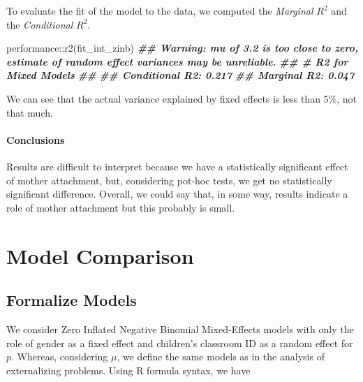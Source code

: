 \documentclass[
]{book}
\newenvironment{Shaded}{\begin{snugshade}}{\end{snugshade}}
\newcommand{\DocumentationTok}[1]{\textcolor[rgb]{0.56,0.35,0.01}{\textbf{\textit{#1}}}}
\newcommand{\FunctionTok}[1]{\textcolor[rgb]{0.00,0.00,0.00}{#1}}
\newcommand{\NormalTok}[1]{#1}
\newcommand{\SpecialCharTok}[1]{\textcolor[rgb]{0.00,0.00,0.00}{#1}}
\begin{document}
To evaluate the fit of the model to the data, we computed the \emph{Marginal} \(R^2\) and the \emph{Conditional} \(R^2\).

\begin{Shaded}
\begin{Highlighting}[]
\NormalTok{performance}\SpecialCharTok{::}\FunctionTok{r2}\NormalTok{(fit\_int\_zinb)}
\DocumentationTok{\#\# Warning: mu of 3.2 is too close to zero, estimate of random effect variances may be unreliable.}
\DocumentationTok{\#\# \# R2 for Mixed Models}
\DocumentationTok{\#\# }
\DocumentationTok{\#\#   Conditional R2: 0.217}
\DocumentationTok{\#\#      Marginal R2: 0.047}
\end{Highlighting}
\end{Shaded}

We can see that the actual variance explained by fixed effects is less than 5\%, not that much.

\hypertarget{conclusions-3}{%
\subsubsection*{Conclusions}\label{conclusions-3}}

Results are difficult to interpret because we have a statistically significant effect of mother attachment, but, considering pot-hoc tests, we get no statistically significant difference.
Overall, we could say that, in some way, results indicate a role of mother attachment but this probably is small.

\hypertarget{model-comparison-int}{%
\chapter{Model Comparison}\label{model-comparison-int}}

\hypertarget{formalize-models-1}{%
\section{Formalize Models}\label{formalize-models-1}}

We consider Zero Inflated Negative Binomial Mixed-Effects models with only the role of gender as a fixed effect and children's classroom ID as a random effect for \(p\). Whereas, considering \(\mu\), we define the same models as in the analysis of externalizing problems. Using R formula syntax, we have
\end{document}
